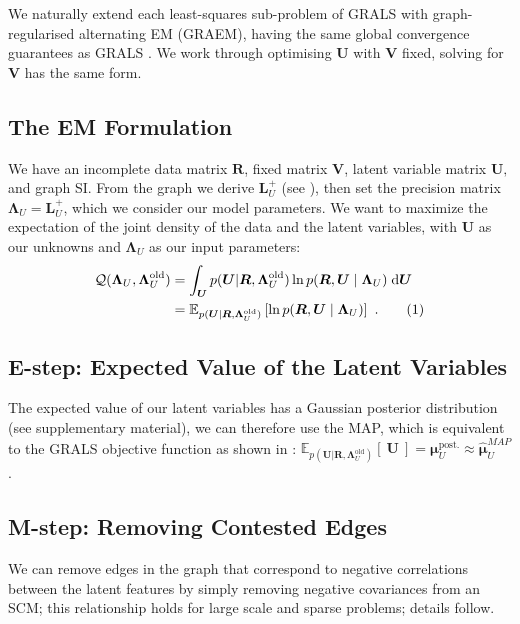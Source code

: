 \documentclass{article}
\theoremstyle{plain}
\theoremstyle{definition}
\theoremstyle{remark}
\newcommand\numberthis{\addtocounter{equation}{1}\tag{\theequation}}
\def\*#1{\boldsymbol{#1}}
\begin{document}
We naturally extend each least-squares sub-problem of GRALS \cite{rao2015collaborative} with graph-regularised alternating EM (GRAEM), having the same global convergence guarantees as GRALS \cite{xu2013block}.  We work through optimising $\*U$ with $\*V$ fixed, solving for $\*V$ has the same form.

\subsection{The EM Formulation}
We have an incomplete data matrix $\*R$, fixed matrix $\*V$, latent variable matrix $\*U,$ and graph SI. From the graph we derive $\*L_U^+$ (see ), then set the precision matrix $\*\Lambda_U=\*L_U^+$, which we consider our model parameters. We want to maximize the expectation of the joint density of the data and the latent variables, with $\*U$ as our unknowns and $\*\Lambda_U$ as our input parameters:
\begin{align*}
\mathcal{Q}(\*\Lambda_U, \*\Lambda_U^{\text{old}}) &= \int_{\*U} p(\*U | \*R, \*\Lambda_U^{\text{old}}) \ln p(\*R,\*U \mid \*\Lambda_U) \; \textrm{d} \*U \\ &= \mathbb{E}_{p(\*U | \*R, \*\Lambda_U^{\text{old}})} \left[ \ln p(\*R,\*U \mid \*\Lambda_U ) \right]  \ . \numberthis
\label{eq:EMQFunc}
\end{align*}
\subsection{E-step: Expected Value of the Latent Variables} \label{sec:EStepFullU} The expected value of our latent variables has a Gaussian posterior distribution (see supplementary material), we can therefore use the MAP, which is equivalent to the GRALS objective function as shown in : $ \mathbb{E}_{p(\*U | \*R, \*\Lambda_U^{\text{old}})}[ \ \*U \ ] = \*\mu_{U}^\text{post.} \approx \hat{\*\mu}^{MAP}_U  \label{eq:PoseMeanMAPApprox}$.

\subsection{M-step: Removing Contested Edges}\label{sec:Mstep}

We can remove edges in the graph that correspond to negative correlations between the latent features by simply removing negative covariances from an SCM; this relationship holds for large scale and sparse problems; details follow.
\end{document}
